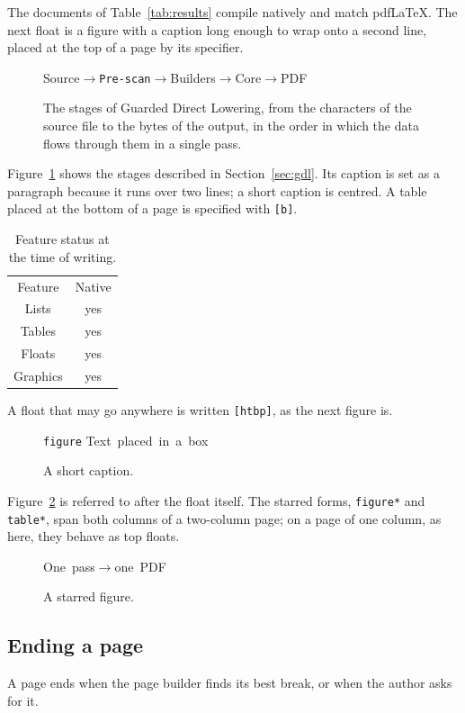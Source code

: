 \documentclass{article}
\numberwithin{equation}{section}
\theoremstyle{definition}
\theoremstyle{remark}
\begin{document}
The documents of Table~\ref{tab:results} compile natively and match pdfLaTeX. The next
float is a figure with a caption long enough to wrap onto a second line, placed at the
top of a page by its specifier.

\begin{figure}[t]
\centering
\mbox{\textsf{Source}\quad$\rightarrow$\quad\texttt{Pre-scan}\quad$\rightarrow$\quad\textsf{Builders}\quad$\rightarrow$\quad\textsf{Core}\quad$\rightarrow$\quad\textsf{PDF}}
\caption{The stages of Guarded Direct Lowering, from the characters of the source file to
the bytes of the output, in the order in which the data flows through them in a single
pass.}\label{fig:pipeline}
\end{figure}

Figure~\ref{fig:pipeline} shows the stages described in Section~\ref{sec:gdl}. Its
caption is set as a paragraph because it runs over two lines; a short caption is
centred. A table placed at the bottom of a page is specified with \texttt{[b]}.

\begin{table}[b]
\centering
\begin{tabular}{c c}
Feature & Native \\
Lists & yes \\
Tables & yes \\
Floats & yes \\
Graphics & yes \\
\end{tabular}
\caption{Feature status at the time of writing.}
\end{table}

A float that may go anywhere is written \texttt{[htbp]}, as the next figure is.

\begin{figure}[htbp]
\centering
\mbox{\texttt{figure}} \quad \mbox{Text placed in a box}
\caption{A short caption.}\label{fig:box}
\end{figure}

Figure~\ref{fig:box} is referred to after the float itself. The starred forms,
\texttt{figure*} and \texttt{table*}, span both columns of a two-column page; on a
page of one column, as here, they behave as top floats.

\begin{figure}
\centering
\mbox{\textsf{One pass}\quad$\rightarrow$\quad\textsf{one PDF}}
\caption{A starred figure.}
\end{figure}

\subsection{Ending a page}\label{sec:clearpage}
A page ends when the page builder finds its best break, or when the author asks for it.
\end{document}
